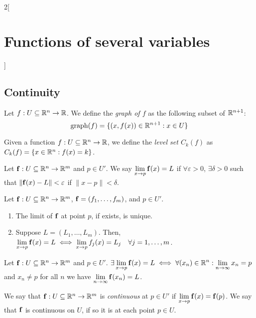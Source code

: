 \documentclass[../../../main.tex]{subfiles}
\begin{document}
\begin{multicols}{2}[\section{Functions of several variables}]
    \subsection{Continuity}
    \begin{definition}
        Let $f:U\subseteq\mathbb{R}^n\rightarrow\mathbb{R} $. We define the \textit{graph of $f$} as the following subset of $\mathbb{R}^{n+1}$: $$\text{graph}(f)=\{(x,f(x))\in\mathbb{R}^{n+1}:x\in U\}$$
    \end{definition}
    \begin{definition}
        Given a function $f:U\subseteq\mathbb{R}^n\rightarrow\mathbb{R} $, we define the \textit{level set $C_k(f)$} as $C_k(f)=\{x\in\mathbb{R}^n:f(x)=k\}$.
    \end{definition}
    \begin{definition}
        Let $\boldsymbol{\mathrm{f}}:U\subseteq\mathbb{R}^n\rightarrow\mathbb{R}^m$ and $p\in U'$. We say $\displaystyle\lim_{x\to p}\boldsymbol{\mathrm{f}}(x)=L$ if $\forall\varepsilon>0$, $\exists\delta>0$ such that $\|\boldsymbol{\mathrm{f}}(x)-L\|<\varepsilon$ if $\|x-p\|<\delta$.
    \end{definition}
    \begin{prop}
        Let $\boldsymbol{\mathrm{f}}:U\subseteq\mathbb{R}^n\rightarrow\mathbb{R}^m$, $\boldsymbol{\mathrm{f}}=(f_1,\ldots,f_m)$, and $p\in U'$.
        \begin{enumerate}
            \item The limit of $\boldsymbol{\mathrm{f}}$ at point $p$, if exists, is unique.
            \item Suppose $L=(L_1,\ldots,L_m)$. Then, $\displaystyle\lim_{x\to p}\boldsymbol{\mathrm{f}}(x)=L\iff\lim_{x\to p}f_j(x)=L_j\quad\forall j=1,\ldots,m$.
        \end{enumerate}
    \end{prop}
    \begin{lemma}
        Let $\boldsymbol{\mathrm{f}}:U\subseteq\mathbb{R}^n\rightarrow\mathbb{R}^m$ and $p\in U'$. $\displaystyle\exists\lim_{x\to p}\boldsymbol{\mathrm{f}}(x)=L\iff\forall(x_n)\in\mathbb{R}^n:\lim_{n\to\infty}x_n=p$ and $x_n\ne p$ for all $n$ we have $\displaystyle\lim_{n\to \infty}\boldsymbol{\mathrm{f}}(x_n)=L$.
    \end{lemma}
    \begin{definition}
        We say that $\boldsymbol{\mathrm{f}}:U\subseteq\mathbb{R}^n\rightarrow\mathbb{R}^m$ is \textit{continuous} at $p\in U'$ if $\displaystyle\lim_{x\to p}\boldsymbol{\mathrm{f}}(x)=\boldsymbol{\mathrm{f}}(p)$. We say that $\boldsymbol{\mathrm{f}}$ is continuous on $U$, if so it is at each point $p\in U$.
    \end{definition}

\end{multicols}
\end{document}
